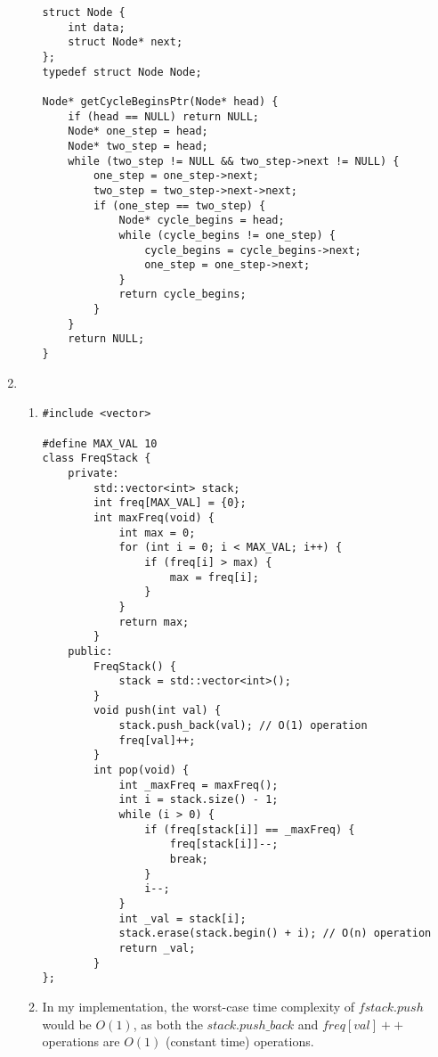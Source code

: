 \documentclass{article}
\begin{document}
\begin{enumerate}
\begin{enumerate}[label=(\alph*)]
\begin{verbatim}
struct Node {
    int data;
    struct Node* next;
};
typedef struct Node Node;

Node* getCycleBeginsPtr(Node* head) {
    if (head == NULL) return NULL;
    Node* one_step = head;
    Node* two_step = head;
    while (two_step != NULL && two_step->next != NULL) {
        one_step = one_step->next;
        two_step = two_step->next->next;
        if (one_step == two_step) {
            Node* cycle_begins = head;
            while (cycle_begins != one_step) {
                cycle_begins = cycle_begins->next;
                one_step = one_step->next;
            }
            return cycle_begins;
        }
    }
    return NULL;
}
        \end{verbatim}
    \end{enumerate}

\item
    \begin{enumerate}[label=(\alph*)]
        \item
        \begin{verbatim}
#include <vector>

#define MAX_VAL 10
class FreqStack {
    private:
        std::vector<int> stack;
        int freq[MAX_VAL] = {0};
        int maxFreq(void) {
            int max = 0;
            for (int i = 0; i < MAX_VAL; i++) {
                if (freq[i] > max) {
                    max = freq[i];
                }
            }
            return max;
        }
    public:
        FreqStack() {
            stack = std::vector<int>();
        }
        void push(int val) {
            stack.push_back(val); // O(1) operation
            freq[val]++;
        }
        int pop(void) {
            int _maxFreq = maxFreq();
            int i = stack.size() - 1;
            while (i > 0) {
                if (freq[stack[i]] == _maxFreq) {
                    freq[stack[i]]--;
                    break;
                }
                i--;
            }
            int _val = stack[i];
            stack.erase(stack.begin() + i); // O(n) operation
            return _val;
        }
};
        \end{verbatim}

        \item In my implementation, the worst-case time complexity of $fstack.push$ would be $O(1)$, as both the $stack.push\_back$ and $freq[val]++$ operations are $O(1)$ (constant time) operations.


\end{enumerate}
\end{enumerate}
\end{document}
